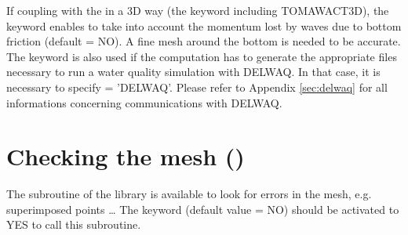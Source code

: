 If coupling with the \tomawac in a 3D way (the keyword 
including TOMAWACT3D), the keyword 
enables to take into account the momentum lost by waves due to
bottom friction (default = NO).
A fine mesh around the bottom is needed to be accurate.\\

The keyword  is also used if the computation
has to generate the appropriate files necessary to run a water quality
simulation with DELWAQ.
In that case, it is necessary to specify  = 'DELWAQ'.
Please refer to Appendix \ref{sec:delwaq} for all informations concerning
communications with DELWAQ.

\section{Checking the mesh ()}

The  subroutine of the \bief library is available to look for
errors in the mesh, e.g. superimposed points \ldots
The keyword  (default value = NO) should be activated
to YES to call this subroutine.
